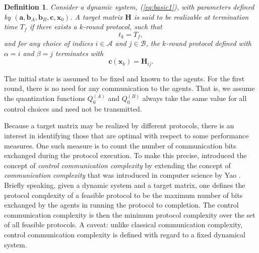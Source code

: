\documentclass[12pt,onecolumn,draftcls]{IEEEtran}
\newcommand{\ba}{\mathbf{a}}
\newcommand{\bb}{\mathbf{b}}
\newcommand{\bc}{\mathbf{c}}
\newcommand{\bx}{\mathbf{x}}
\newcommand{\bH}{\mathbf{H}}
\newcommand{\cA}{\mathcal{A}}
\newcommand{\cB}{\mathcal{B}}
\newtheorem{definition}{Definition}[section]
\begin{document}
\begin{definition}
Consider a dynamic system, (\ref{eq:basic1}), with parameters defined  by $(\ba, \bb_A, \bb_B, \bc, \bx_0)$.
A target matrix $\bH$ is said to be realizable at termination time $T_f$
if there exists a $k$-round protocol, such that
\[ t_{k} = T_f, \]
and for any choice of indices $i \in \cA$ and $j \in \cB$, the $k$-round protocol defined with
$\alpha = i$ and $\beta=j$  terminates with
\begin{equation}
\bc(\bx_{k})=\bH_{ij}.
\end{equation}
\end{definition} 

The initial state is assumed to be fixed and known to the agents.
For the first round, there is no need for any communication to the agents.  That is, we assume the
quantization functions $Q_0^{(A)}$ and $Q_0^{(B)}$ always take the same value for all control choices
and need not be transmitted.

Because a target matrix may be realized by different protocols, there is an interest in identifying those that are optimal
with respect to some performance measures.  One such measure
is to count the number of communication bits exchanged during the protocol execution.
To make this precise, \cite{Wong} introduced the concept of  {\it control communication complexity} by extending the concept of  {\em communication complexity} that was introduced in computer science by Yao
\cite{yao1}.  Briefly speaking, given a dynamic system and a target matrix, one defines the protocol complexity of a feasible protocol to be the maximum number of bits exchanged by the agents in running the protocol to completion.   The control communication complexity is then the minimum protocol complexity over the set of all feasible protocols.  A caveat: unlike classical communication complexity, control communication complexity is defined with regard to a fixed dynamical system. 
\end{document}
